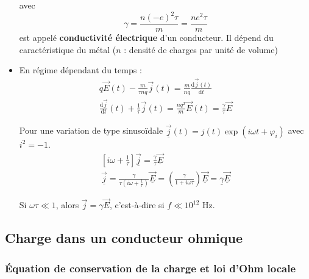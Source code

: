 \begin{itemize}
            avec 
            \begin{equation}
              \boxed{\gamma = \frac{n (-e) ^{2}\tau}{m} =\frac{ne ^{2}\tau}{m}}
            \end{equation} 
            est appelé \textbf{conductivité électrique} d'un conducteur. Il dépend du caractéristique du métal ($n$ : densité de charges par unité de volume)

          \item En régime dépendant du temps : 
            \begin{gather}
              q \overrightarrow{E}(t) - \frac{m}{\tau nq}  \overrightarrow{j}(t) = \frac{m}{nq} \frac{\mathrm{d}\overrightarrow{j}(t)}{\mathrm{d}t}  \\ 
              \frac{\mathrm{d} \overrightarrow{j}}{\mathrm{d}t}  (t) + \frac{1}{\tau}  \overrightarrow{j}(t) = \frac{nq ^{2}}{m} \overrightarrow{E}(t) = \frac{\gamma}{\tau}  \overrightarrow{E}
            \end{gather}

          Pour une variation de type sinusoïdale $\underline{\overrightarrow{j}}(t) = j(t) \exp (i \omega t + \varphi _i)$ avec $i ^{2} = -1$.
          \begin{gather}
            \left[i \omega + \frac{1}{\tau} \right] \underline{\overrightarrow{j}} = \frac{\gamma}{\tau}  \underline{\overrightarrow{E}} \\ 
            \underline{\overrightarrow{j}} = \frac{\gamma}{\tau \left(i \omega + \frac{1}{\tau} \right)} \underline{\overrightarrow{E}}  = \left( \frac{\gamma}{1 + i \omega \tau} \right) \underline{\overrightarrow{E}} = \underline{\gamma} \underline{\overrightarrow{E}}
          \end{gather}

          Si $\omega \tau \ll 1$, alors $\overrightarrow{j} = \gamma \overrightarrow{E}$, c'est-à-dire si $f \ll 10 ^{12}$ Hz.
\end{itemize}

\subsection{Charge dans un conducteur ohmique} %
\label{sub:Charge dans un conducteur ohmique}

\subsubsection{Équation de conservation de la charge et loi d'Ohm locale} %
\label{sec:Équation de conservation de la charge et loi d'Ohm locale}

